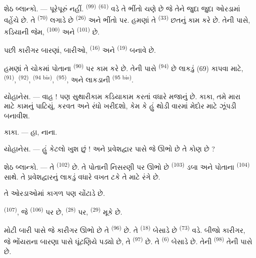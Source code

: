 \textsc{શેઠ બ્લાન્કો}. --- પૂરેપૂરું નહીં.  \textsuperscript{(99)}  \textsuperscript{(61)} વડે
તે ભીંતો ચણે છે જે તેને જુદા જુદા ઓરડામાં વહેંચે છે. તે 
\textsuperscript{(70)} લગાડે છે  \textsuperscript{(26)} અને
ભીંતો પર. હમણાં તે 
\textsuperscript{(33)} છતનું કામ કરે છે. તેની પાસે, કડિયાની જેમ,
 \textsuperscript{(100)} અને 
\textsuperscript{(101)} છે.

પછી કારીગર બારણાં, બારીઓ, 
\textsuperscript{(16)} અને  \textsuperscript{(19)}
બનાવે છે.

હમણાં તે ચોકમાં પોતાના  \textsuperscript{(90)} પર
કામ કરે છે. તેની પાસે  \textsuperscript{(94)} છે લાકડું
(69) કાપવા માટે,  \textsuperscript{(91)},
 \textsuperscript{(92)}, 
\textsuperscript{(94 bis)},  \textsuperscript{(95)}, અને
લાકડાની  \textsuperscript{(95 bis)}.

\textsc{યોહાનેસ}. --- વાહ ! પણ સુથારીકામ કડિયાકામ કરતાં વધારે મજાનું
છે. કાકા, તમે મારા માટે કામનું પાટિયું, કરવત અને રંધો ખરીદશો, કેમ કે
હું થોડી વારમાં મેદોર માટે ઝૂંપડી બનાવીશ.

\textsc{કાકા}. --- હા, નાના.

\textsc{યોહાનેસ}. --- હું કેટલો ખુશ છું ! અને પ્રવેશદ્વાર પાસે જે
ઊભો છે તે કોણ છે ?

\VUsaut{3.0mm}
\VUsaut{3.0mm}

\textsc{શેઠ બ્લાન્કો}. --- તે  \textsuperscript{(102)}
છે. તે પોતાની નિસરણી પર ઊભો છે 
\textsuperscript{(103)} ડબા અને પોતાના 
\textsuperscript{(104)} સાથે. તે પ્રવેશદ્વારનું લાકડું વધારે વખત ટકે
તે માટે રંગે છે.

તે ઓરડાઓમાં કાગળ પણ ચોંટાડે છે.

 \textsuperscript{(107)}, જે 
\textsuperscript{(106)} પર છે,  \textsuperscript{(28)} પર,
 \textsuperscript{(29)} મૂકે છે.

મોટી બારી પાસે જે કારીગર ઊભો છે તે 
\textsuperscript{(96)} છે. તે 
\textsuperscript{(18)} બેસાડે છે  \textsuperscript{(73)}
વડે. બીજો કારીગર, જે ભોંયરાના બારણા પાસે ઘૂંટણિયે પડ્યો છે, તે
 \textsuperscript{(97)} છે. તે 
\textsuperscript{(6)} બેસાડે છે. તેની 
\textsuperscript{(98)} તેની પાસે છે.

